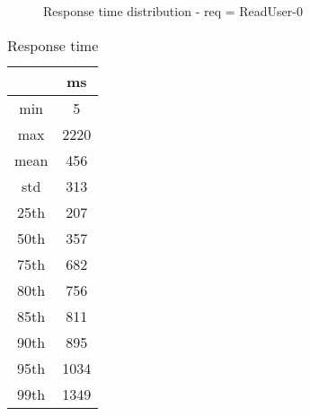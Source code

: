 \begin{minipage}{0.75\linewidth}
\begin{figure}[h]
\begin{adjustbox}{max width=1.0\linewidth, keepaspectratio}
  \end{adjustbox}
  \caption{Response time distribution - req = ReadUser-0}
\end{figure}
\end{minipage}\hfill\begin{minipage}{0.18\linewidth}
\begin{table}[h]
\begin{tabular}{|cc|}
\hline
\textbf{} & \textbf{ms}\\ \hline
 \Xhline{0.005\arrayrulewidth}
min & 5\\
 \Xhline{0.005\arrayrulewidth}
max & 2220\\
 \Xhline{0.005\arrayrulewidth}
mean & 456\\
 \Xhline{0.005\arrayrulewidth}
std & 313\\
\hline
\hline
 \Xhline{0.005\arrayrulewidth}
25th & 207\\
 \Xhline{0.005\arrayrulewidth}
50th & 357\\
 \Xhline{0.005\arrayrulewidth}
75th & 682\\
 \Xhline{0.005\arrayrulewidth}
80th & 756\\
 \Xhline{0.005\arrayrulewidth}
85th & 811\\
 \Xhline{0.005\arrayrulewidth}
90th & 895\\
 \Xhline{0.005\arrayrulewidth}
95th & 1034\\
 \Xhline{0.005\arrayrulewidth}
99th & 1349\\
\hline
\end{tabular}
\caption{Response time}
\end{table}
\end{minipage}\hfill